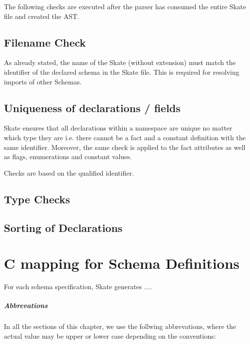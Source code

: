 \documentclass[a4paper,11pt,twoside]{report}
\begin{document}
{{The following checks are executed after the parser has consumed the entire
Skate file and created the AST.

\section{Filename Check}
As already stated, the name of the Skate (without extension) must match the 
identifier of the declared schema in the Skate file. This is required for 
resolving imports of other Schemas. 

\section{Uniqueness of declarations / fields}
Skate ensures that all declarations within a namespace are unique no matter 
which type they are i.e. there cannot be a fact and a constant definition with 
the same identifier. Moreover, the same check is applied to the fact attributes 
as well as flags, enumerations and constant values.

Checks are based on the qualified identifier.

\section{Type Checks}



\section{Sorting of Declarations}

\chapter{C mapping for Schema Definitions}
\label{chap:cmapping}

For each schema specification, Skate generates ....

\paragraph{Abbrevations}
In all the sections of this chapter, we use the follwing abbrevations, where 
the actual value may be upper or lower case depending on the conventions:

}}
\end{document}
